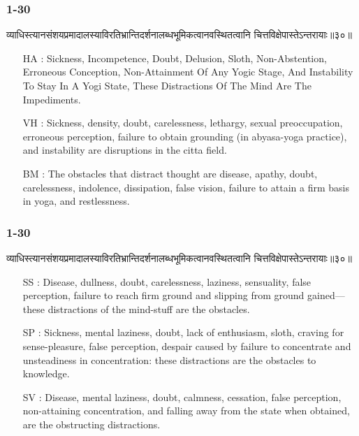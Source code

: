 \begin{frame}[fragile]\frametitle{1-30}
\begin{sanskrit}
व्याधिस्त्यानसंशयप्रमादालस्याविरतिभ्रान्तिदर्शनालब्धभूमिकत्वानवस्थितत्वानि चित्तविक्षेपास्तेऽन्तरायाः॥३०॥
\end{sanskrit}


\begin{itemize}	
\item [HA]: Sickness, Incompetence, Doubt, Delusion, Sloth, Non-Abstention, Erroneous Conception, Non-Attainment Of Any Yogic Stage, And Instability To Stay In A Yogi State, These Distractions Of The Mind Are The Impediments.
\item [VH]: Sickness, density, doubt, carelessness, lethargy, sexual preoccupation, erroneous perception, failure to obtain grounding (in abyasa-yoga practice), and instability are disruptions in the citta field.
\item [BM]: The obstacles that distract thought are disease, apathy, doubt, carelessness, indolence, dissipation, false vision, failure to attain a firm basis in yoga, and restlessness.
\end{itemize}

\end{frame}

\begin{frame}[fragile]\frametitle{1-30}
\begin{sanskrit}
व्याधिस्त्यानसंशयप्रमादालस्याविरतिभ्रान्तिदर्शनालब्धभूमिकत्वानवस्थितत्वानि चित्तविक्षेपास्तेऽन्तरायाः॥३०॥
\end{sanskrit}


\begin{itemize}	
\item [SS]: Disease, dullness, doubt, carelessness, laziness, sensuality, false perception, failure to reach firm ground and slipping from ground gained—these distractions of the mind-stuff are the obstacles.
\item [SP]: Sickness, mental laziness, doubt, lack of enthusiasm, sloth, craving for sense-pleasure, false perception, despair caused by failure to concentrate and unsteadiness in concentration: these distractions are the obstacles to knowledge.
\item [SV]: Disease, mental laziness, doubt, calmness, cessation, false perception, non-attaining concentration, and falling away from the state when obtained, are the obstructing distractions.
\end{itemize}

\end{frame}






